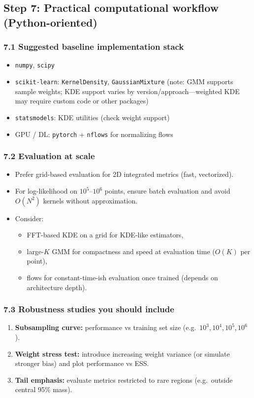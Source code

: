 \documentclass[twocolumn]{notes}
\begin{document}
\subsection{Step 7: Practical computational workflow (Python-oriented)}

\subsubsection{7.1 Suggested baseline implementation stack}
\begin{itemize}[leftmargin=2em]
\item \texttt{numpy}, \texttt{scipy}
\item \texttt{scikit-learn}: \texttt{KernelDensity}, \texttt{GaussianMixture} (note: GMM supports sample weights; KDE support varies by version/approach---weighted KDE may require custom code or other packages)
\item \texttt{statsmodels}: KDE utilities (check weight support)
\item GPU / DL: \texttt{pytorch} + \texttt{nflows} for normalizing flows
\end{itemize}

\subsubsection{7.2 Evaluation at scale}
\begin{itemize}[leftmargin=2em]
\item Prefer grid-based evaluation for 2D integrated metrics (fast, vectorized).
\item For log-likelihood on $10^5$--$10^6$ points, ensure batch evaluation and avoid $O(N^2)$ kernels without approximation.
\item Consider:
  \begin{itemize}
  \item FFT-based KDE on a grid for KDE-like estimators,
  \item large-$K$ GMM for compactness and speed at evaluation time ($O(K)$ per point),
  \item flows for constant-time-ish evaluation once trained (depends on architecture depth).
  \end{itemize}
\end{itemize}

\subsubsection{7.3 Robustness studies you should include}
\begin{enumerate}[leftmargin=2em]
\item \textbf{Subsampling curve:} performance vs training set size (e.g.\ $10^3,10^4,10^5,10^6$).
\item \textbf{Weight stress test:} introduce increasing weight variance (or simulate stronger bias) and plot performance vs ESS.
\item \textbf{Tail emphasis:} evaluate metrics restricted to rare regions (e.g.\ outside central 95\% mass).
\end{enumerate}
\end{document}
